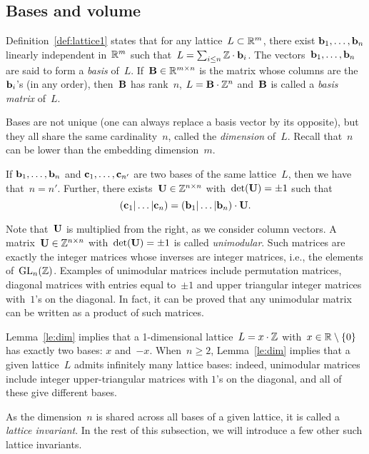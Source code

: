 \subsection{Bases and volume}

Definition~\ref{def:lattice1} states that for any lattice~$L \subset \mathbb{R}^m$, there exist ${\bf b}_1, \ldots, {\bf b}_n$  
linearly independent in~$\mathbb{R}^m$ such that~$L= \sum_{i \leq n} \mathbb{Z}\cdot {\bf b}_i$. The vectors~${\bf b}_1, \ldots, {\bf b}_n$  
are said to form a \emph{basis} of~$L$. If~${\bf B} \in \mathbb{R}^{m \times n}$ is the matrix whose columns are the~${\bf b}_i$'s (in any order), then~${\bf B}$ has rank~$n$, $L = {\bf B} \cdot \mathbb{Z}^n$ and~${\bf B}$ is called a \emph{basis matrix} of~$L$.

Bases are not unique (one can always replace a basis vector by its opposite), but they all share the same cardinality~$n$, called the \emph{dimension} of~$L$. Recall that~$n$ can be lower than the embedding dimension~$m$.  

\begin{lemma}
\label{le:dim}
If ${\bf b}_1, \ldots, {\bf b}_n$ and ${\bf c}_1, \ldots, {\bf c}_{n'}$ are two bases of the same lattice~$L$, then we have that~$n=n'$. 
Further, there exists~${\bf U} \in \mathbb{Z}^{n \times n}$ with~$\det ({\bf U}) = \pm 1$ such that 
\[
\left({\bf c}_1|\ldots |{\bf c}_n \right) = \left({\bf b}_1|\ldots |{\bf b}_n \right) \cdot {\bf U}.
\]
\end{lemma}

Note that~${\bf U}$ is multiplied from the right, as we consider column vectors. 
A matrix~${\bf U} \in \mathbb{Z}^{n \times n}$ with~$\det ({\bf U}) = \pm 1$ is called \emph{unimodular}. Such matrices are exactly
the integer matrices whose inverses are integer matrices, i.e., the elements of~$\mbox{GL}_n(\mathbb{Z})$. Examples of unimodular matrices include permutation matrices, diagonal matrices with entries equal to~$\pm 1$ and upper triangular integer matrices with~$1$'s on the diagonal. In fact, it can be proved that any unimodular matrix can be written as a product of such matrices. 

Lemma~\ref{le:dim} implies
that a 1-dimensional lattice~$L = x \cdot \mathbb{Z}$ with~$x \in \mathbb{R}\setminus \{0\}$ has exactly  two bases: $x$ and~$-x$. When~$n \geq 2$, 
Lemma~\ref{le:dim} implies that a given lattice~$L$ admits infinitely many lattice bases: indeed, unimodular matrices include integer upper-triangular matrices with $1$'s on the diagonal, and all of these give different bases.  

As the dimension~$n$ is shared across all bases of a given lattice, it is called a \emph{lattice invariant}. 
In the rest of this subsection, we will introduce a few other such lattice invariants. 

